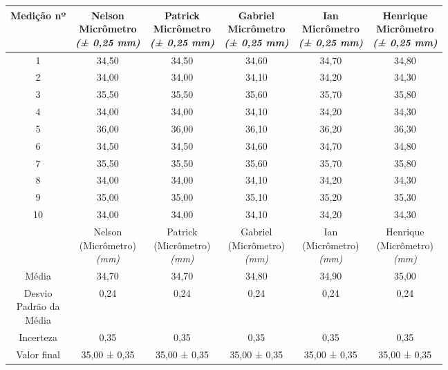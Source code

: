 \documentclass{article}
\begin{document}
\begin{table}[h!]
\centering
\begin{tabular}{c c c c c c }
\toprule
Medição nº & \shortstack{Nelson\\Micrômetro\\\textit{(± 0,25 mm)}} & \shortstack{Patrick\\Micrômetro\\\textit{(± 0,25 mm)}} & \shortstack{Gabriel\\Micrômetro\\\textit{(± 0,25 mm)}} & \shortstack{Ian\\Micrômetro\\\textit{(± 0,25 mm)}} & \shortstack{Henrique\\Micrômetro\\\textit{(± 0,25 mm)}}\\
\midrule
1 & 34,50 & 34,50 & 34,60 & 34,70 & 34,80\\
2 & 34,00 & 34,00 & 34,10 & 34,20 & 34,30\\
3 & 35,50 & 35,50 & 35,60 & 35,70 & 35,80\\
4 & 34,00 & 34,00 & 34,10 & 34,20 & 34,30\\
5 & 36,00 & 36,00 & 36,10 & 36,20 & 36,30\\
6 & 34,50 & 34,50 & 34,60 & 34,70 & 34,80\\
7 & 35,50 & 35,50 & 35,60 & 35,70 & 35,80\\
8 & 34,00 & 34,00 & 34,10 & 34,20 & 34,30\\
9 & 35,00 & 35,00 & 35,10 & 35,20 & 35,30\\
10 & 34,00 & 34,00 & 34,10 & 34,20 & 34,30\\
\midrule
&\shortstack{Nelson\\(Micrômetro)\\\textit{(mm)}} & \shortstack{Patrick\\(Micrômetro)\\\textit{(mm)}} & \shortstack{Gabriel\\(Micrômetro)\\\textit{(mm)}} & \shortstack{Ian\\(Micrômetro)\\\textit{(mm)}} & \shortstack{Henrique\\(Micrômetro)\\\textit{(mm)}}\\
\midrule
Média & 34,70 & 34,70 & 34,80 & 34,90 & 35,00\\[3pt]
\shortstack{Desvio\\Padrão da\\Média} & 0,24 & 0,24 & 0,24 & 0,24 & 0,24\\[3pt]
Incerteza & 0,35 & 0,35 & 0,35 & 0,35 & 0,35\\[3pt]
Valor final & 35,00 ± 0,35 & 35,00 ± 0,35 & 35,00 ± 0,35 & 35,00 ± 0,35 & 35,00 ± 0,35\\[3pt]
\bottomrule
\end{tabular}
\end{table}
\end{document}
